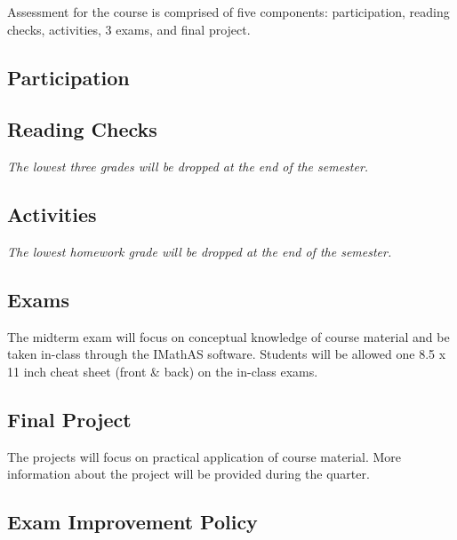 \documentclass[
  letterpaper,
  DIV=11,
  numbers=noendperiod]{scrreprt}
\begin{document}
Assessment for the course is comprised of five components:
participation, reading checks, activities, 3 exams, and final project.

\hypertarget{participation}{%
\subsection*{Participation}\label{participation}}

\hypertarget{reading-checks}{%
\subsection*{Reading Checks}\label{reading-checks}}

\emph{The lowest three grades will be dropped at the end of the
semester.}

\hypertarget{activities}{%
\subsection*{Activities}\label{activities}}

\emph{The lowest homework grade will be dropped at the end of the
semester.}

\hypertarget{exams}{%
\subsection*{Exams}\label{exams}}

The midterm exam will focus on conceptual knowledge of course material
and be taken in-class through the IMathAS software. Students will be
allowed one 8.5 x 11 inch cheat sheet (front \& back) on the in-class
exams.

\hypertarget{final-project}{%
\subsection*{Final Project}\label{final-project}}

The projects will focus on practical application of course material.
More information about the project will be provided during the quarter.

\hypertarget{exam-improvement-policy}{%
\subsection*{Exam Improvement Policy}\label{exam-improvement-policy}}
\end{document}
